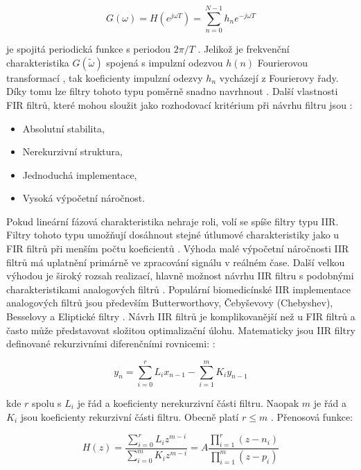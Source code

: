 \begin{equation}
	\label{eq:freq_fir}
	G(\omega) = H(e^{j \omega T}) = \sum_{n=0}^{N-1} h_n e^{-j \omega T}
\end{equation}

je spojitá periodická funkce s periodou $2\pi/T$ \cite{Jan2002}. Jelikož je
frekvenční charakteristika $G(\widetilde\omega)$ spojená s impulzní odezvou
$h(n)$ Fourierovou transformací \cite{Prchal2000}, tak koeficienty impulzní
odezvy $h_n$ vycházejí z Fourierovy řady. Díky tomu lze filtry tohoto typu
poměrně snadno navrhnout \cite{Jan2002}. Další vlastnosti FIR filtrů, které
mohou sloužit jako rozhodovací kritérium při návrhu filtru jsou
\cite{Prchal2000}:

\begin{itemize}
	\item Absolutní stabilita,
	\item Nerekurzivní struktura,
	\item Jednoduchá implementace,
	\item Vysoká výpočetní náročnost.
\end{itemize}

Pokud lineární fázová charakteristika nehraje roli, volí se spíše filtry typu
IIR. Filtry tohoto typu umožňují dosáhnout stejné útlumové charakteristiky jako
u FIR filtrů při menším počtu koeficientů \cite{Prchal2000}. Výhoda malé
výpočetní náročnosti IIR filtrů má uplatnění primárně ve zpracování signálu v
reálném čase. Další velkou výhodou je široký rozsah realizací, hlavně možnost
návrhu IIR filtru s podobnými charakteristikami analogových filtrů
\cite{Jan2002,Lyons1997}. Populární biomedicínské IIR implementace analogových
filtrů jsou především Butterworthovy, Čebyševovy (Chebyshev), Besselovy a
Eliptické filtry \cite{Paarmann2006}. Návrh IIR filtrů je komplikovanější než u
FIR filtrů a často může představovat složitou optimalizační úlohu. Matematicky
jsou IIR filtry definované rekurzivními diferenčními rovnicemi: \cite{Jan2002}:

\begin{equation}
	\label{eq:conv_iir}
	y_n = \sum_{i=0}^{r} L_i x_{n-1} - \sum_{i=1}^{m} K_i y_{n-1}
\end{equation}

kde $r$ spolu s $L_i$ je řád a koeficienty nerekurzivní části filtru. Naopak $m$
je řád a $K_i$ jsou koeficienty rekurzivní části filtru. Obecně platí $r \leq m$
\cite{Jan2002,Prchal2000}. Přenosová funkce:

\begin{equation}
	\label{eq:transfer_iir}
	H(z) = \frac{\sum_{i=0}^{r} L_i z^{m-i}}{\sum_{i=0}^{m} K_i z^{m-i}} = A \frac{\prod_{i=1}^{r} (z-n_i)}{\prod_{i=1}^{m} (z-p_i)}
\end{equation}

